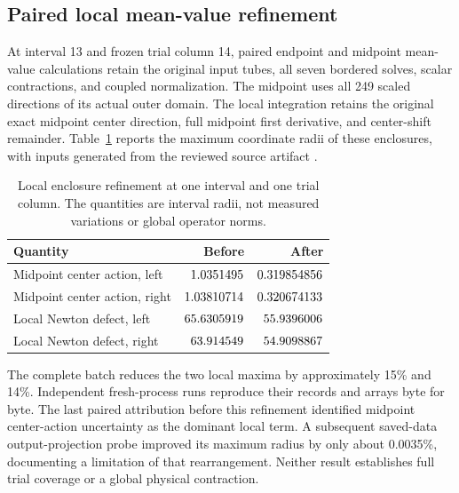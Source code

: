 \documentclass[11pt]{article}
\begin{document}
\subsection{Paired local mean-value refinement}
At interval 13 and frozen trial column 14, paired endpoint and midpoint
mean-value calculations retain the original input tubes, all seven bordered
solves, scalar contractions, and coupled normalization. The midpoint uses
all 249 scaled directions of its actual outer domain. The local integration
retains the original exact midpoint center direction, full midpoint first
derivative, and center-shift remainder. Table~\ref{tab:local} reports the
maximum coordinate radii of these enclosures, with inputs generated from
the reviewed source artifact \cite{localrefinement}.
\begin{table}[ht]
\centering
\caption{Local enclosure refinement at one interval and one trial column.
The quantities are interval radii, not measured variations or global operator norms.}
\label{tab:local}
\begin{tabular}{lrr}
\toprule
Quantity & Before & After\\
\midrule
Midpoint center action, left & \(1.0351495\) & \(0.319854856\)\\
Midpoint center action, right & \(1.03810714\) & \(0.320674133\)\\
Local Newton defect, left & \(65.6305919\) & \(55.9396006\)\\
Local Newton defect, right & \(63.914549\) & \(54.9098867\)\\
\bottomrule
\end{tabular}
\end{table}
The complete batch reduces the two local maxima by approximately 15\% and
14\%. Independent fresh-process runs reproduce their records and arrays
byte for byte. The last paired attribution before this refinement identified
midpoint center-action uncertainty as the dominant local term. A subsequent
saved-data output-projection probe improved its maximum radius by only about
0.0035\%, documenting a limitation of that rearrangement. Neither result
establishes full trial coverage or a global physical contraction.
\end{document}
